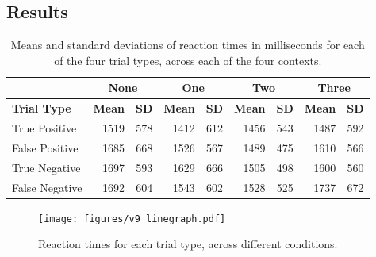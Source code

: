 \documentclass[man]{apa2}
\begin{document}
\subsection{Results}
\begin{table}
\centering
\setlength{\tabcolsep}{10pt}
\begin{tabular}{ l  r  r  r  r  r  r  r  r} 
\hline
\hline
& \multicolumn{2}{c}{\bf{None}} & \multicolumn{2}{c}{\bf{One}}  & \multicolumn{2}{c}{\bf{Two}}  & \multicolumn{2}{c}{\bf{Three}}\\
\hline
  \bf{Trial Type} & \bf{Mean} & \bf{SD} & \bf{Mean} & \bf{SD} & \bf{Mean} & \bf{SD} & \bf{Mean} & \bf{SD} \\ \hline \hline                       
True Positive & 1519 & 578 & 1412 & 612 & 1456 & 543 & 1487 & 592\\
\hline
 False Positive & 1685 & 668 & 1526 & 567 & 1489 & 475 & 1610 & 566\\
\hline
 True Negative& 1697 & 593 & 1629 & 666 & 1505 & 498 & 1600 & 560\\
\hline
  False Negative & 1692 & 604 & 1543 & 602 & 1528 & 525 & 1737 & 672\\
  \hline
\hline
\end{tabular}
\caption{Means and standard deviations of reaction times in milliseconds for each of the four trial types, across each of the four contexts.}
\end{table}

\begin{figure}
\begin{center} 
\texttt{[image: figures/v9\_linegraph.pdf]}
\caption{\label{fig:addition_subs} Reaction times for each trial type, across different conditions.}
\end{center} 
\end{figure}
\end{document}
